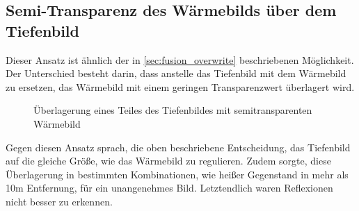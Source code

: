 \subsection{Semi-Transparenz des Wärmebilds über dem Tiefenbild}
Dieser Ansatz ist ähnlich der in \ref{sec:fusion_overwrite} beschriebenen Möglichkeit.
Der Unterschied besteht darin, dass anstelle das Tiefenbild mit dem Wärmebild zu ersetzen, das Wärmebild mit einem geringen Transparenzwert überlagert wird.
\begin{figure}[H]
	\centering
	\caption{Überlagerung eines Teiles des Tiefenbildes mit semitransparenten Wärmebild}
	\label{fig:fusion_transparenz}
\end{figure}

Gegen diesen Ansatz sprach, die oben beschriebene Entscheidung, das Tiefenbild auf die gleiche Größe, wie das Wärmebild zu regulieren.
Zudem sorgte, diese Überlagerung in bestimmten Kombinationen, wie heißer Gegenstand in mehr als 10m Entfernung, für ein unangenehmes Bild.
Letztendlich waren Reflexionen nicht besser zu erkennen.

